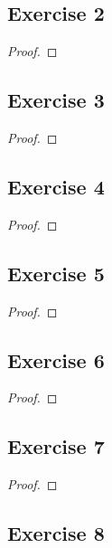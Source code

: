 \documentclass[14pt]{extarticle}
\begin{document}
\subsection{Exercise 2}

\begin{proof}

\end{proof}

\subsection{Exercise 3}

\begin{proof}

\end{proof}

\subsection{Exercise 4}

\begin{proof}

\end{proof}

\subsection{Exercise 5}

\begin{proof}

\end{proof}

\subsection{Exercise 6}

\begin{proof}

\end{proof}

\subsection{Exercise 7}

\begin{proof}

\end{proof}

\subsection{Exercise 8}
\end{document}
